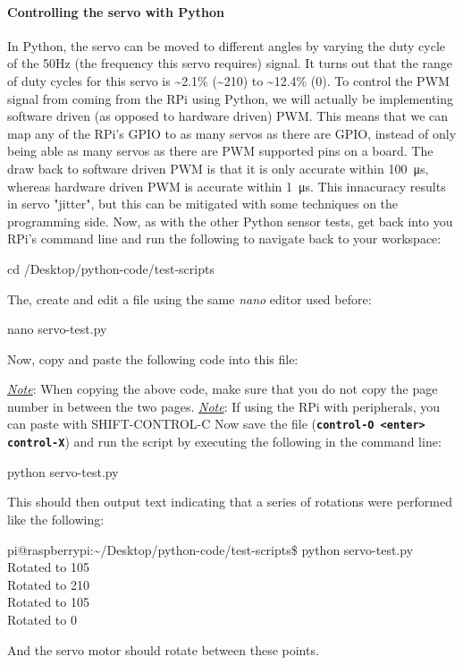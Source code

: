 \documentclass{article}
\newcommand*{\myfont}{\fontfamily{pcr}\selectfont}
\newcommand{\codeb}[2]{
  \begin{tcolorbox}[width=\textwidth,colback={SpringGreen},title={#1},colbacktitle=darkgreen,coltitle=SpringGreen]
    \myfont
    #2
  \end{tcolorbox}
} %
\newcommand{\outputb}[2]{
  \begin{tcolorbox}[width=\textwidth,colback={light-gray},title={#1},colbacktitle=gray,coltitle=light-gray]
    \myfont
    #2
  \end{tcolorbox}
} %
\newcommand{\note}[1]{\underline{\textit{Note}}: #1}
\begin{document}
    \paragraph{Controlling the servo with Python}
    In Python, the servo can be moved to different angles by varying the duty cycle of the 50Hz (the frequency this servo requires) signal. It turns out that the range of duty cycles for this servo is \textasciitilde2.1\% (\textasciitilde210\degree) to \textasciitilde12.4\% (0\degree). To control the PWM signal from coming from the RPi using Python, we will actually be implementing software driven (as opposed to hardware driven) PWM. This means that we can map any of the RPi's GPIO to as many servos as there are GPIO, instead of only being able as many servos as there are PWM supported pins on a board. The draw back to software driven PWM is that it is only accurate within \SI{100}{\micro\second}, whereas hardware driven PWM is accurate within \SI{1}{\micro\second}. This innacuracy results in servo "jitter", but this can be mitigated with some techniques on the programming side. Now, as with the other Python sensor tests, get back into you RPi's command line and run the following to navigate back to your workspace:
    \codeb{Navigate to your workspace}
    {
      cd  /Desktop/python-code/test-scripts
    }
    The, create and edit a file using the same \textit{nano} editor used before:
    \codeb{Create servo Python testing script file}
    {
      nano servo-test.py
    }
    Now, copy and paste the following code into this file:
     
    \note{When copying the above code, make sure that you do not copy the page number in between the two pages.}
    \note{If using the RPi with peripherals, you can paste with SHIFT-CONTROL-C}
    \newline
    \noindent
    Now save the file (\texttt{\textbf{control-O <enter> control-X}}) and run the script by executing the following in the command line:
    \codeb{Run the test script for the servo motor}
    {
      python servo-test.py
    }
    This should then output text indicating that a series of rotations were performed like the following:
    \outputb{Test script output for servo motor}
    {
      pi@raspberrypi:\textasciitilde/Desktop/python-code/test-scripts\$ python servo-test.py \\
      Rotated to 105\degree                                                        \\
      Rotated to 210\degree                                                        \\
      Rotated to 105\degree                                                        \\
      Rotated to 0\degree
    }
    And the servo motor should rotate between these points.
\end{document}
